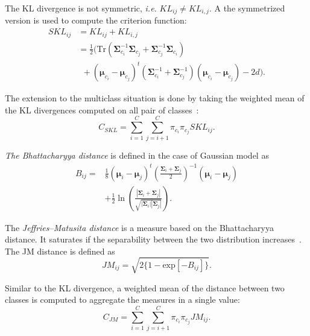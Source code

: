 \documentclass[journal,peerreview,onecolumn]{IEEEtran}
\begin{document}
        The    KL   divergence    is   not    symmetric,   \emph{i.e.}
        $KL_{ij} \ne KL_{i,j}$.  A the symmetrized version  is used to
        compute the criterion function:
        \begin{align}
          SKL_{ij} &=KL_{ij} + KL_{i,j} \nonumber \\
            &= \frac{1}{2} \biggl( \text{Tr} (\boldsymbol{\Sigma}_{c_i}^{-1} \boldsymbol{\Sigma}_{c_j} + \boldsymbol{\Sigma}_{c_j}^{-1} \boldsymbol{\Sigma}_{c_i}) \nonumber \\
            &~~+ (\boldsymbol{\mu}_{c_i} - \boldsymbol{\mu}_{c_j})^t (\boldsymbol{\Sigma}_{c_i}^{-1} + \boldsymbol{\Sigma}_{c_j}^{-1}) (\boldsymbol{\mu}_{c_i} - \boldsymbol{\mu}_{c_j}) - 2d \biggr).
        \end{align}

        The extension  to the multiclass  situation is done  by taking
        the weighted mean  of the KL divergences computed  on all pair
        of classes~\cite{bruzzone1995extension}:
        \begin{equation}
            C_{SKL} = \sum_{i=1}^{C} \sum_{j=i + 1}^{C} \pi_{c_i} \pi_{c_j} SKL_{ij}.
        \end{equation}

        \emph{The Bhattacharyya distance} is defined in the case of Gaussian model as
        \begin{align}
            {B}_{ij} = &\frac{1}{8} (\boldsymbol{\mu}_i - \boldsymbol{\mu}_j)^t \left( \frac{\boldsymbol{\Sigma}_i + \boldsymbol{\Sigma}_j}{2} \right)^{-1} (\boldsymbol{\mu}_i - \boldsymbol{\mu}_j) \nonumber \\
            &+ \frac{1}{2} \ln \left( \frac{|\boldsymbol{\Sigma}_i + \boldsymbol{\Sigma}_j|}{\sqrt{|\boldsymbol{\Sigma}_i| |\boldsymbol{\Sigma}_j|}} \right).
        \end{align}

        The \emph{Jeffries–Matusita distance} is a measure based on the Bhattacharyya distance. It saturates if the separability between the two distribution increases~\cite{bruzzone2009novel}. The JM distance is defined as
        \begin{equation}
            {JM}_{ij} = \sqrt{ 2 \{1 - \text{exp}[-B_{ij}]\} }.
        \end{equation}

        Similar to the KL divergence,  a weighted mean of the distance
        between two classes is computed to aggregate the measures in a
        single value:
        \begin{equation}
            {C}_{JM} = \sum_{i=1}^{C} \sum_{j=i + 1}^{C} \pi_{c_i} \pi_{c_j} {JM}_{ij}.
        \end{equation}
\end{document}
